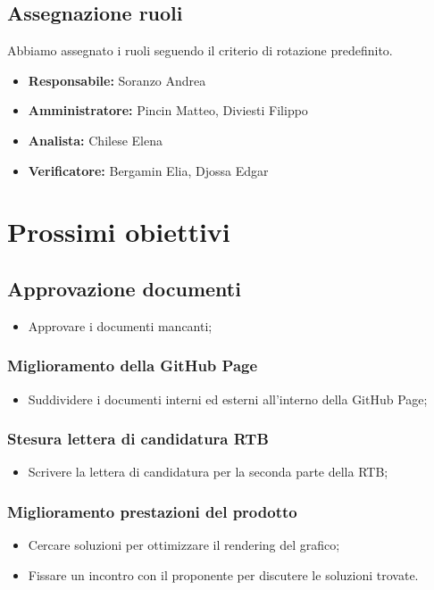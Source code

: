 \subsection{Assegnazione ruoli}
Abbiamo assegnato i ruoli seguendo il criterio di rotazione predefinito.
\begin{itemize}
    \item \textbf{Responsabile:} Soranzo Andrea
    \item \textbf{Amministratore:} Pincin Matteo, Diviesti Filippo
    \item \textbf{Analista:} Chilese Elena
    \item \textbf{Verificatore:} Bergamin Elia, Djossa Edgar
\end{itemize}

\section{Prossimi obiettivi}
\subsection{Approvazione documenti}
\begin{itemize}
    \item Approvare i documenti mancanti;
\end{itemize}

\subsubsection{Miglioramento della GitHub Page}
\begin{itemize}
    \item Suddividere i documenti interni ed esterni all'interno della GitHub Page;
\end{itemize}

\subsubsection{Stesura lettera di candidatura RTB}
\begin{itemize}
    \item Scrivere la lettera di candidatura per la seconda parte della RTB;
\end{itemize}

\subsubsection{Miglioramento prestazioni del prodotto}
\begin{itemize}
    \item Cercare soluzioni per ottimizzare il rendering del grafico;
    \item Fissare un incontro con il proponente per discutere le soluzioni trovate.
\end{itemize}

